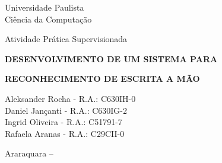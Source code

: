 \begin{center}
	\Huge Universidade Paulista\\
	\large Ciência da Computação
	
	\vfill
	
	\large Atividade Prática Supervisionada
	
	\textbf{\MakeUppercase{Desenvolvimento de um sistema para }}
	
	\textbf{\MakeUppercase{reconhecimento de escrita a mão}}
	
	\bigskip
	
	\normalsize{
		Aleksander Rocha - R.A.: C630IH-0\\
		Daniel Jançanti - R.A.: C630IG-2\\
		Ingrid Oliveira - R.A.: C51791-7\\
		Rafaela Aranas - R.A.: C29CII-0\\
	}
	
	\vfill
	
	Araraquara -- \the\year

\end{center}

\thispagestyle{empty}